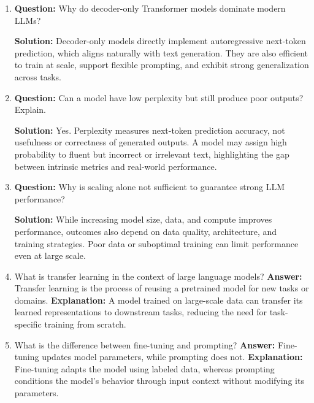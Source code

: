 \documentclass{article}
\begin{document}
\begin{enumerate}
\textbf{Explanation:} BLEU and ROUGE measure n-gram overlap with reference text, but multiple valid outputs may exist. They do not directly evaluate meaning, reasoning, or factual correctness.

\item \textbf{Question:} 
Why do decoder-only Transformer models dominate modern LLMs?

\textbf{Solution:}  
Decoder-only models directly implement autoregressive next-token prediction, which aligns naturally with text generation. They are also efficient to train at scale, support flexible prompting, and exhibit strong generalization across tasks.

\item \textbf{Question:} 
Can a model have low perplexity but still produce poor outputs? Explain.

\textbf{Solution:}  
Yes. Perplexity measures next-token prediction accuracy, not usefulness or correctness of generated outputs. A model may assign high probability to fluent but incorrect or irrelevant text, highlighting the gap between intrinsic metrics and real-world performance.

\item \textbf{Question:} 
Why is scaling alone not sufficient to guarantee strong LLM performance?

\textbf{Solution:}  
While increasing model size, data, and compute improves performance, outcomes also depend on data quality, architecture, and training strategies. Poor data or suboptimal training can limit performance even at large scale.

\item What is transfer learning in the context of large language models?\newline
\textbf{Answer:} Transfer learning is the process of reusing a pretrained model for new tasks or domains.\newline
\textbf{Explanation:} A model trained on large-scale data can transfer its learned representations to downstream tasks, reducing the need for task-specific training from scratch.

\item What is the difference between fine-tuning and prompting?\newline
\textbf{Answer:} Fine-tuning updates model parameters, while prompting does not.\newline
\textbf{Explanation:} Fine-tuning adapts the model using labeled data, whereas prompting conditions the model’s behavior through input context without modifying its parameters.


\end{enumerate}
\end{document}
